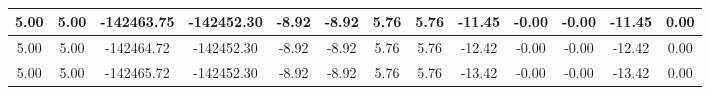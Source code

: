 \begin{table}[htbp]
\begin{adjustbox}{angle=90}
\begin{tabular}{|c|c|c|c|c|c|c|c|c|c|c|c|c|}
 5.00 & 5.00 & -142463.75 & -142452.30 & -8.92 & -8.92 & 5.76 & 5.76 & -11.45 & -0.00 & -0.00 & -11.45 & 0.00\\ \hline
 5.00 & 5.00 & -142464.72 & -142452.30 & -8.92 & -8.92 & 5.76 & 5.76 & -12.42 & -0.00 & -0.00 & -12.42 & 0.00\\ \hline
 5.00 & 5.00 & -142465.72 & -142452.30 & -8.92 & -8.92 & 5.76 & 5.76 & -13.42 & -0.00 & -0.00 & -13.42 & 0.00\\ \hline
            \end{tabular}
        \end{adjustbox}
        \caption{}
        \label{}
    \end{table}
    